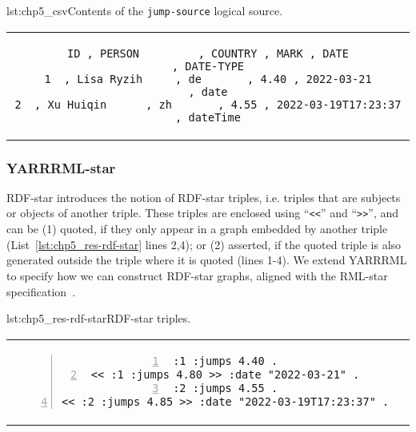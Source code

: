 \noindent\begin{minipage}{\linewidth}
\centering
\begin{captionedlisting}
{lst:chp5_csv}{Contents of the \texttt{jump-source} logical source.}
\centering
\begin{tabular}{c}
{\begin{lstlisting}[basicstyle=\ttfamily\small,columns=flexible]
ID , PERSON         , COUNTRY , MARK , DATE                       , DATE-TYPE
1  , Lisa Ryzih     , de       , 4.40 , 2022-03-21                , date
2  , Xu Huiqin      , zh       , 4.55 , 2022-03-19T17:23:37       , dateTime
\end{lstlisting}}
\end{tabular}
\end{captionedlisting}
\end{minipage}

\subsubsection{YARRRML-star} %


RDF-star introduces the notion of RDF-star triples, i.e. triples that are subjects or objects of another triple. These triples are enclosed using ``\texttt{<<}'' and ``\texttt{>>}'', and can be (1) quoted, if they only appear in a graph embedded by another triple (List~\ref{lst:chp5_res-rdf-star} lines 2,4); or (2) asserted, if the quoted triple is also generated outside the triple where it is quoted (lines 1-4).
We extend YARRRML to specify how we can construct RDF-star graphs, aligned with the RML-star specification~\citep{iglesias2022rmlstar}.

\begin{minipage}{\linewidth}
\centering
\begin{captionedlisting}{lst:chp5_res-rdf-star}{RDF-star triples.}
\centering
\begin{tabular}{c}
{\begin{lstlisting}[numbers=left,basicstyle=\ttfamily\small,columns=flexible]
:1 :jumps 4.40 .
<< :1 :jumps 4.80 >> :date "2022-03-21" .
:2 :jumps 4.55 .
<< :2 :jumps 4.85 >> :date "2022-03-19T17:23:37" .
\end{lstlisting}}
\end{tabular}
\end{captionedlisting}
\end{minipage}

